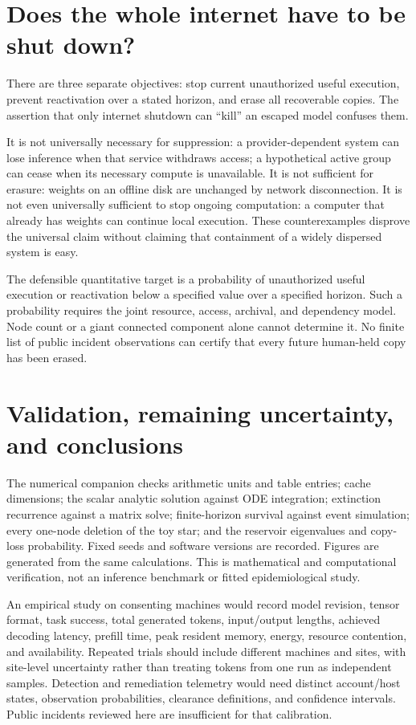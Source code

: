 \documentclass[11pt]{article}
\begin{document}
\section{Does the whole internet have to be shut down?}
There are three separate objectives: stop current unauthorized useful execution, prevent reactivation over a stated horizon, and erase all recoverable copies. The assertion that only internet shutdown can ``kill'' an escaped model confuses them.

It is not universally necessary for suppression: a provider-dependent system can lose inference when that service withdraws access; a hypothetical active group can cease when its necessary compute is unavailable. It is not sufficient for erasure: weights on an offline disk are unchanged by network disconnection. It is not even universally sufficient to stop ongoing computation: a computer that already has weights can continue local execution. These counterexamples disprove the universal claim without claiming that containment of a widely dispersed system is easy.

The defensible quantitative target is a probability of unauthorized useful execution or reactivation below a specified value over a specified horizon. Such a probability requires the joint resource, access, archival, and dependency model. Node count or a giant connected component alone cannot determine it. No finite list of public incident observations can certify that every future human-held copy has been erased.

\section{Validation, remaining uncertainty, and conclusions}
The numerical companion checks arithmetic units and table entries; cache dimensions; the scalar analytic solution against ODE integration; extinction recurrence against a matrix solve; finite-horizon survival against event simulation; every one-node deletion of the toy star; and the reservoir eigenvalues and copy-loss probability. Fixed seeds and software versions are recorded. Figures are generated from the same calculations. This is mathematical and computational verification, not an inference benchmark or fitted epidemiological study.

An empirical study on consenting machines would record model revision, tensor format, task success, total generated tokens, input/output lengths, achieved decoding latency, prefill time, peak resident memory, energy, resource contention, and availability. Repeated trials should include different machines and sites, with site-level uncertainty rather than treating tokens from one run as independent samples. Detection and remediation telemetry would need distinct account/host states, observation probabilities, clearance definitions, and confidence intervals. Public incidents reviewed here are insufficient for that calibration.
\end{document}

